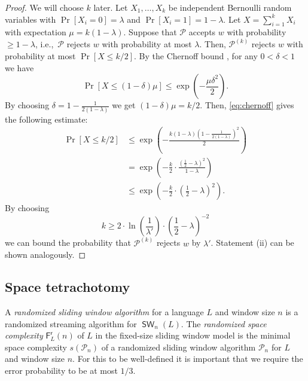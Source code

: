 \documentclass{theoretics}
\renewcommand{\P}{\mathcal{P}}
\newcommand{\F}{\mathsf{F}}
\renewcommand{\r}{\mathsf{r}}
\DeclareMathOperator{\SW}{\mathsf{SW}}
\renewcommand{\geq}{\geqslant}
\renewcommand{\leq}{\leqslant}
\renewcommand{\ge}{\geq}
\renewcommand{\le}{\leq}
\begin{document}
\begin{proof}
	We will choose $k$ later.
	Let $X_1, \dots, X_k$ be independent Bernoulli random variables
	with $\Pr[X_i = 0] = \lambda$ and $\Pr[X_i = 1] = 1-\lambda$.
	Let $X = \sum_{i=1}^k X_i$ with expectation $\mu = k (1-\lambda)$.
	Suppose that $\P$ accepts $w$ with probability $\ge 1-\lambda$,
	i.e.,~$\P$ rejects $w$ with probability at most $\lambda$.
	Then, $\P^{(k)}$ rejects $w$ with probability at most $\Pr[X \le k/2]$.
	By the Chernoff bound \cite[Theorem~4.5]{MitzenmacherU17},
	for any $0 < \delta < 1$ we have
	\begin{equation}
		\label{eq:chernoff}
		\Pr[X \le (1-\delta)\mu] \le \exp\left(-\frac{\mu\delta^2}{2}\right).
	\end{equation}
	By choosing $\delta = 1 - \frac{1}{2(1-\lambda)}$ we get $(1-\delta)\mu = k/2$.
	Then, \eqref{eq:chernoff} gives the following estimate:
	\begin{align*}
		 \Pr[X \le k/2] 
		&\le \exp\left(-\frac{k(1-\lambda)(1 - \frac{1}{2(1-\lambda)})^2}{2}\right) \\
		&= \exp\left(-\frac{k}{2}\cdot \frac{(\frac{1}{2}-\lambda)^2}{1-\lambda} \right) \\
		&\le \exp\left(-\frac{k}{2}\cdot \left(\frac{1}{2}-\lambda\right)^2 \right).
	\end{align*}
	By choosing
	\[
		k \ge 2 \cdot \ln \left( \frac{1}{\lambda'} \right) \cdot \left(\frac{1}{2}-\lambda\right)^{-2}
	\]
	we can bound the probability that $\P^{(k)}$ rejects $w$ by $\lambda'$.
	Statement (ii) can be shown analogously.
\end{proof}


\subsection{Space tetrachotomy}
A {\em randomized sliding window algorithm} for a language $L$ and window size $n$
is a randomized streaming algorithm for $\SW_n(L)$.
The {\em randomized space complexity} $\F^\r_L(n)$ of $L$ in the fixed-size sliding window model
is the minimal space complexity $s(\P_n)$ of a randomized sliding window algorithm
$\P_n$ for $L$ and window size $n$. For this to be well-defined it is important that we require the error
probability to be at most $1/3$.
\end{document}

